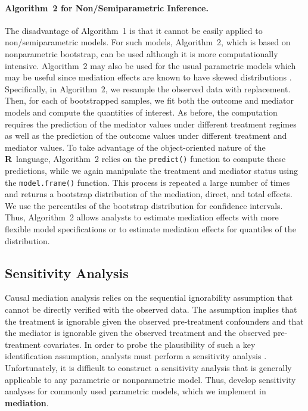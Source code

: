 \documentclass[11pt,letterpaper]{article}
\theoremstyle{plain}
\newcommand\bR{{\bf R}}
\newcommand\bmediation{{\bf mediation}}
\begin{document}
\paragraph{Algorithm~2 for Non/Semiparametric Inference.}

The disadvantage of Algorithm~1 is that it cannot be easily applied to
non/semiparametric models.  For such models, Algorithm~2, which is
based on nonparametric bootstrap, can be used although it is more
computationally intensive.  Algorithm~2 may also be used for the usual
parametric models which may be useful since mediation effects are
known to have skewed distributions
\citep[e.g.,][]{MacKinnon:2004,Preacher:Hayes:08}.  Specifically, in
Algorithm~2, we resample the observed data with replacement.  Then,
for each of bootstrapped samples, we fit both the outcome and mediator
models and compute the quantities of interest.  As before, the
computation requires the prediction of the mediator values under
different treatment regimes as well as the prediction of the outcome
values under different treatment and mediator values.  To take
advantage of the object-oriented nature of the \bR\ language,
Algorithm~2 relies on the \texttt{predict()} function to compute these
predictions, while we again manipulate the treatment and mediator
status using the \texttt{model.frame()} function. This process is
repeated a large number of times and returns a bootstrap distribution
of the mediation, direct, and total effects.  We use the percentiles
of the bootstrap distribution for confidence intervals. Thus,
Algorithm~2 allows analysts to estimate mediation effects with more
flexible model specifications or to estimate mediation effects for
quantiles of the distribution.

\subsection{Sensitivity Analysis}

Causal mediation analysis relies on the sequential ignorability
assumption that cannot be directly verified with the observed data.
The assumption implies that the treatment is ignorable given the
observed pre-treatment confounders and that the mediator is ignorable
given the observed treatment and the observed pre-treatment
covariates.  In order to probe the plausibility of such a key
identification assumption, analysts must perform a sensitivity
analysis \citep{rose:02c}.  Unfortunately, it is difficult to
construct a sensitivity analysis that is generally applicable to any
parametric or nonparametric model.  Thus,
\citet{imai:keel:yama:10,imai:keel:ting:10} develop sensitivity
analyses for commonly used parametric models, which we implement in
\bmediation.
\end{document}
